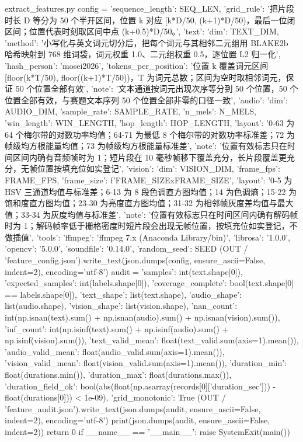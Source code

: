 \documentclass[bwprint]{gmcmthesis}
\begin{document}
\begin{appendices}
\begin{Python}{extract\_features.py}
    config = {'sequence_length': SEQ_LEN, 'grid_rule': '把片段时长 D 等分为 50 个半开区间，位置 k 对应 [k*D/50, (k+1)*D/50)，最后一位闭区间；位置代表时刻取区间中点 (k+0.5)*D/50。', 'text': {'dim': TEXT_DIM, 'method': '小写化与英文词元切分后，把每个词元与其相邻二元组用 BLAKE2b 哈希映射到 768 维词袋，词元权重 1.0、二元组权重 0.5，逐位置 L2 归一化', 'hash_person': 'mosei2026', 'tokens_per_position': '位置 k 覆盖词元区间 [floor(k*T/50), floor((k+1)*T/50))，T 为词元总数；区间为空时取相邻词元，保证 50 个位置全部有效', 'note': '文本通道按词元出现次序等分到 50 个位置，50 个位置全部有效，与赛题文本序列 50 个位置全部非零的口径一致'}, 'audio': {'dim': AUDIO_DIM, 'sample_rate': SAMPLE_RATE, 'n_mels': N_MELS, 'win_length': WIN_LENGTH, 'hop_length': HOP_LENGTH, 'layout': '0-63 为 64 个梅尔带的对数功率均值；64-71 为最低 8 个梅尔带的对数功率标准差；72 为帧级均方根能量均值；73 为帧级均方根能量标准差', 'note': '位置有效标志只在时间区间内确有音频帧时为 1；短片段在 10 毫秒帧移下覆盖充分，长片段覆盖更充分，无帧位置按填充位如实登记'}, 'vision': {'dim': VISION_DIM, 'frame_fps': FRAME_FPS, 'frame_size': f'{FRAME_SIZE}x{FRAME_SIZE}', 'layout': '0-5 为 HSV 三通道均值与标准差；6-13 为 8 段色调直方图均值；14 为色调熵；15-22 为饱和度直方图均值；23-30 为亮度直方图均值；31-32 为相邻帧灰度差均值与最大值；33-34 为灰度均值与标准差', 'note': '位置有效标志只在时间区间内确有解码帧时为 1；解码帧率低于栅格密度时短片段会出现无帧位置，按填充位如实登记，不做插值'}, 'tools': {'ffmpeg': 'ffmpeg 7.x (Anaconda Library/bin)', 'librosa': '1.0.0', 'opencv': '5.0.0', 'soundfile': '0.14.0'}, 'random_seed': SEED}
    (OUT / 'feature_config.json').write_text(json.dumps(config, ensure_ascii=False, indent=2), encoding='utf-8')
    audit = {'samples': int(text.shape[0]), 'expected_samples': int(labels.shape[0]), 'coverage_complete': bool(text.shape[0] == labels.shape[0]), 'text_shape': list(text.shape), 'audio_shape': list(audio.shape), 'vision_shape': list(vision.shape), 'nan_count': int(np.isnan(text).sum() + np.isnan(audio).sum() + np.isnan(vision).sum()), 'inf_count': int(np.isinf(text).sum() + np.isinf(audio).sum() + np.isinf(vision).sum()), 'text_valid_mean': float(text_valid.sum(axis=1).mean()), 'audio_valid_mean': float(audio_valid.sum(axis=1).mean()), 'vision_valid_mean': float(vision_valid.sum(axis=1).mean()), 'duration_min': float(durations.min()), 'duration_max': float(durations.max()), 'duration_field_ok': bool(abs(float(np.asarray(records[0]['duration_sec'])) - float(durations[0])) < 1e-09), 'grid_monotonic': True}
    (OUT / 'feature_audit.json').write_text(json.dumps(audit, ensure_ascii=False, indent=2), encoding='utf-8')
    print(json.dumps(audit, ensure_ascii=False, indent=2))
    return 0
if __name__ == '__main__':
    raise SystemExit(main())
\end{Python}


\end{appendices}
\end{document}
